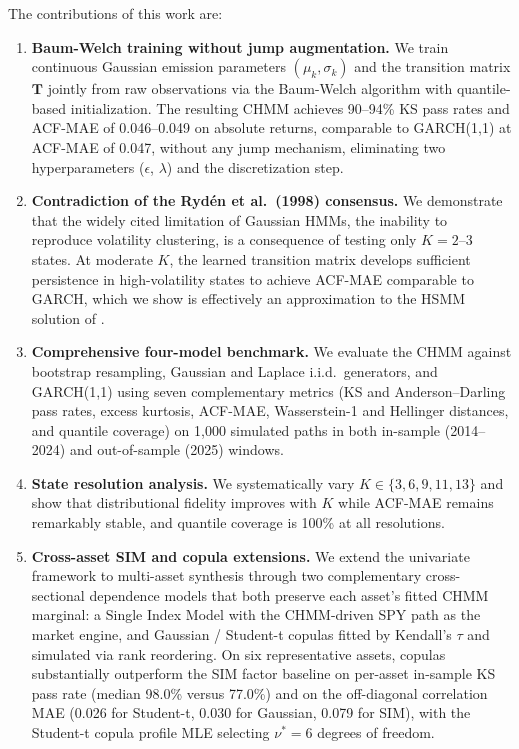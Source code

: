 The contributions of this work are:
\begin{enumerate}
    \item \textbf{Baum-Welch training without jump augmentation.}
    We train continuous Gaussian emission parameters $(\mu_k, \sigma_k)$ and the transition matrix $\mathbf{T}$ jointly from raw observations via the Baum-Welch algorithm with quantile-based initialization.
    The resulting CHMM achieves 90--94\% KS pass rates and ACF-MAE of 0.046--0.049 on absolute returns, comparable to GARCH(1,1) at ACF-MAE of 0.047, without any jump mechanism, eliminating two hyperparameters ($\epsilon$, $\lambda$) and the discretization step.

    \item \textbf{Contradiction of the Ryd\'{e}n et al.\ (1998) consensus.}
    We demonstrate that the widely cited limitation of Gaussian HMMs, the inability to reproduce volatility clustering, is a consequence of testing only $K = 2$--$3$ states.
    At moderate $K$, the learned transition matrix develops sufficient persistence in high-volatility states to achieve ACF-MAE comparable to GARCH, which we show is effectively an approximation to the HSMM solution of \citet{bulla2006stylized}.

    \item \textbf{Comprehensive four-model benchmark.}
    We evaluate the CHMM against bootstrap resampling, Gaussian and Laplace i.i.d.\ generators, and GARCH(1,1) using seven complementary metrics (KS and Anderson--Darling pass rates, excess kurtosis, ACF-MAE, Wasserstein-1 and Hellinger distances, and quantile coverage) on 1{,}000 simulated paths in both in-sample (2014--2024) and out-of-sample (2025) windows.

    \item \textbf{State resolution analysis.}
    We systematically vary $K \in \{3, 6, 9, 11, 13\}$ and show that distributional fidelity improves with $K$ while ACF-MAE remains remarkably stable, and quantile coverage is 100\% at all resolutions.

    \item \textbf{Cross-asset SIM and copula extensions.}
    We extend the univariate framework to multi-asset synthesis through two complementary cross-sectional dependence models that both preserve each asset's fitted CHMM marginal: a Single Index Model with the CHMM-driven SPY path as the market engine, and Gaussian / Student-t copulas fitted by Kendall's $\tau$ and simulated via rank reordering.
    On six representative assets, copulas substantially outperform the SIM factor baseline on per-asset in-sample KS pass rate (median 98.0\% versus 77.0\%) and on the off-diagonal correlation MAE (0.026 for Student-t, 0.030 for Gaussian, 0.079 for SIM), with the Student-t copula profile MLE selecting $\nu^* = 6$ degrees of freedom.


\end{enumerate}
